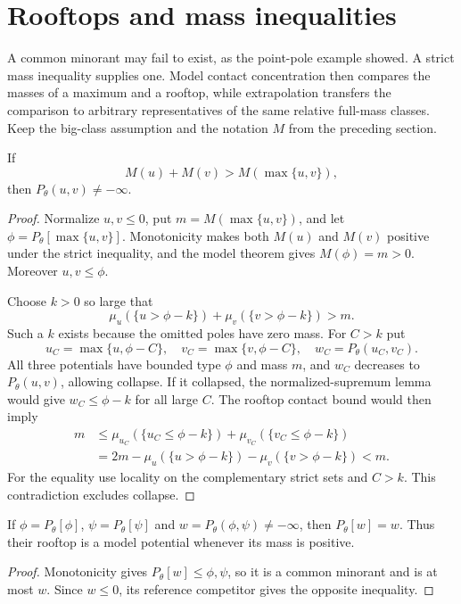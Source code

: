 \section{Rooftops and mass inequalities}
\label{sec:rooftop-mass-inequalities}
A common minorant may fail to exist, as the point-pole example showed. A strict mass inequality supplies one. Model contact concentration then compares the masses of a maximum and a rooftop, while extrapolation transfers the comparison to arbitrary representatives of the same relative full-mass classes. Keep the big-class assumption and the notation $M$ from the preceding section.

\begin{proposition}\label{prop:positive-mass-rooftop-existence}
If
\[
 M(u)+M(v)>M(\max\{u,v\}),
\]
then $P_\theta(u,v)\ne-\infty$.
\end{proposition}
\begin{proof}
Normalize $u,v\leq0$, put $m=M(\max\{u,v\})$, and let $\phi=P_\theta[\max\{u,v\}]$. Monotonicity makes both $M(u)$ and $M(v)$ positive under the strict inequality, and the model theorem gives $M(\phi)=m>0$. Moreover $u,v\leq\phi$.

Choose $k>0$ so large that
\[
 \mu_u(\{u>\phi-k\})+\mu_v(\{v>\phi-k\})>m.
\]
Such a $k$ exists because the omitted poles have zero mass. For $C>k$ put
\[
 u_C=\max\{u,\phi-C\},\quad
 v_C=\max\{v,\phi-C\},\quad
 w_C=P_\theta(u_C,v_C).
\]
All three potentials have bounded type $\phi$ and mass $m$, and $w_C$ decreases to $P_\theta(u,v)$, allowing collapse. If it collapsed, the normalized-supremum lemma would give $w_C\leq\phi-k$ for all large $C$. The rooftop contact bound would then imply
\[
 \begin{split}
 m&\leq\mu_{u_C}(\{u_C\leq\phi-k\})
                +\mu_{v_C}(\{v_C\leq\phi-k\})\\
  &=2m-\mu_u(\{u>\phi-k\})-\mu_v(\{v>\phi-k\})<m.
 \end{split}
\]
For the equality use locality on the complementary strict sets and $C>k$. This contradiction excludes collapse.
\end{proof}

\begin{proposition}\label{prop:model-rooftop-fixed-point}
If $\phi=P_\theta[\phi]$, $\psi=P_\theta[\psi]$ and $w=P_\theta(\phi,\psi)\ne-\infty$, then $P_\theta[w]=w$. Thus their rooftop is a model potential whenever its mass is positive.
\end{proposition}
\begin{proof}
Monotonicity gives $P_\theta[w]\leq\phi,\psi$, so it is a common minorant and is at most $w$. Since $w\leq0$, its reference competitor gives the opposite inequality.
\end{proof}

